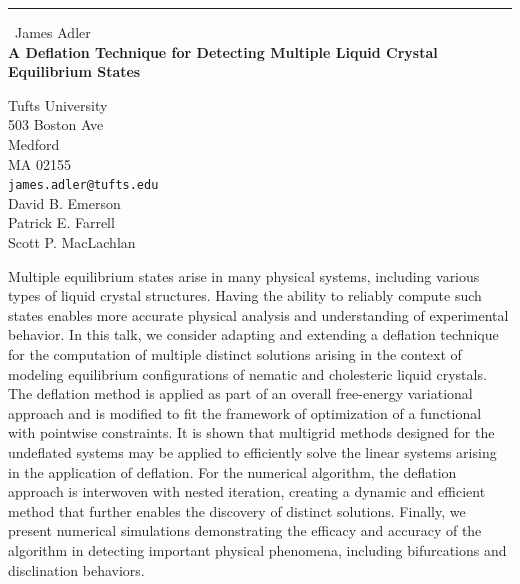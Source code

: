 \documentclass{report}
\begin{document}
\begin{center}
\rule{6in}{1pt} \
{\large James Adler \\
{\bf A Deflation Technique for Detecting Multiple Liquid Crystal Equilibrium States}}

Tufts University \\ 503 Boston Ave \\ Medford \\ MA 02155
\\
{\tt james.adler@tufts.edu}\\
David B.  Emerson\\
Patrick E.  Farrell\\
Scott P.  MacLachlan\end{center}

Multiple equilibrium states arise in many physical systems, including
various types of liquid crystal structures. Having the ability to
reliably compute such states enables more accurate physical analysis and
understanding of experimental behavior. In this talk, we consider
adapting and extending a deflation technique for the computation of
multiple distinct solutions arising in the context of modeling
equilibrium configurations of nematic and cholesteric liquid crystals.
The deflation method is applied as part of an overall free-energy
variational approach and is modified to fit the framework of optimization
of a functional with pointwise constraints. It is shown that multigrid
methods designed for the undeflated systems may be applied to efficiently
solve the linear systems arising in the application of deflation. For the
numerical algorithm, the deflation approach is interwoven with nested
iteration, creating a dynamic and efficient method that further enables
the discovery of distinct solutions. Finally, we present numerical
simulations demonstrating the efficacy and accuracy of the algorithm in
detecting important physical phenomena, including bifurcations and
disclination behaviors.
\end{document}
